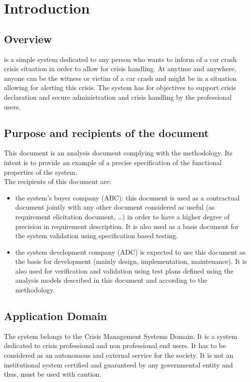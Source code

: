 
\chapter{Introduction}
\label{chap:introduction}

\section{Overview}
\msricrash is a simple system dedicated to any person who wants to inform of a
car crash crisis situation in order to allow for crisis handling.
At anytime and anywhere, anyone can be the witness or victim of a car crash and might be
in a situation allowing for alerting this crisis. 
The \msricrash system has for objectives to support crisis declaration and secure administration and crisis handling by the \msricrash professional users. 

\section{Purpose and recipients of the document}
This document is an analysis document complying with the \msrmessir
methodology\cite{messirbook}. Its intent is to provide an example of a precise
specification of the functional properties of the \msricrash system. \\

The recipients of this document are:
\begin{itemize}
\item the \msricrash system's buyer company (ABC): this document is used as a
contractual document jointly with any other document considered as useful (as
requirement elicitation document, \ldots) in order to have a higher degree of
precision in requirement description. It is also used as a basis document
for the \msricrash system validation using specification based testing.
\item the \msricrash system development company (ADC) is expected to use this document as
the basis for development (mainly design, implementation, maintenance). It is also
 used for verification and validation using test plans defined using the
analysis models described in this document and according to the \msrmessir methodology.
 
\end{itemize} 

 
\section{Application Domain}
The \msricrash system belongs to the Crisis Management Systems Domain. It is a
system dedicated to crisis professional and non professional end users. It has
to be considered as an autonomous and external service for the society. 
It is not an institutional system certified and guaranteed by any governmental
entity and thus, must be used with caution.

